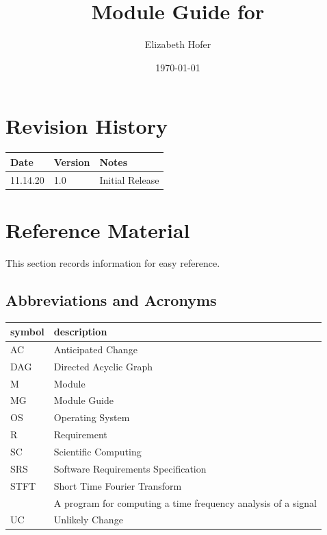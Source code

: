 \documentclass[12pt, titlepage]{article}
\begin{document}
\title{Module Guide for \progname{}} 
\author{Elizabeth Hofer}
\date{\today}

\maketitle


\section{Revision History}

\begin{tabularx}{\textwidth}{p{3cm}p{2cm}X}
\toprule {\bf Date} & {\bf Version} & {\bf Notes}\\
\midrule
11.14.20 & 1.0 & Initial Release\\
\bottomrule
\end{tabularx}

\newpage

\section{Reference Material}

This section records information for easy reference.

\subsection{Abbreviations and Acronyms}

\renewcommand{\arraystretch}{1.2}
\begin{tabular}{l l} 
  \toprule		
  \textbf{symbol} & \textbf{description}\\
  \midrule 
  AC & Anticipated Change\\
  DAG & Directed Acyclic Graph \\
  M & Module \\
  MG & Module Guide \\
  OS & Operating System \\
  R & Requirement\\
  SC & Scientific Computing \\
  SRS & Software Requirements Specification\\
  STFT & Short Time Fourier Transform\\
  \progname{} & A program for computing a time frequency analysis of a signal\\
  UC & Unlikely Change \\
  \bottomrule
\end{tabular}\\
\end{document}
